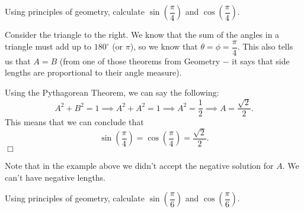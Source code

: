 \documentclass[lang=en,11pt]{elegantbook}
\begin{document}
\begin{example}
Using principles of geometry, calculate $\sin\left(\dfrac{\pi}{4}\right)$ and $\cos\left(\dfrac{\pi}{4}\right)$.
\end{example}
\begin{solution}
Consider the triangle to the right. We know that the sum of the angles in a triangle must add up to $180^{\circ}$ (or $\pi$), so we know that $\theta=\phi=\dfrac{\pi}{4}$.  This also tells us that $A=B$ (from one of those theorems from Geometry $-$ it says that side lengths are proportional to their angle measure).

Using the Pythagorean Theorem, we can say the following: $$A^2+B^2=1 \implies A^2+A^2=1 \implies A^2=\dfrac{1}{2} \implies A=\dfrac{\sqrt{2}}{2}.$$ This means that we can conclude that $$\sin\left(\dfrac{\pi}{4}\right)=\cos\left(\dfrac{\pi}{4}\right)=\dfrac{\sqrt{2}}{2}.$$ $\Box$
\end{solution}
\begin{remark}
Note that in the example above we didn't accept the negative solution for $A$.  We can't have negative lengths.
\end{remark}
\begin{example}
Using principles of geometry, calculate $\sin\left(\dfrac{\pi}{6}\right)$ and $\cos\left(\dfrac{\pi}{6}\right)$.
\end{example}
\end{document}
